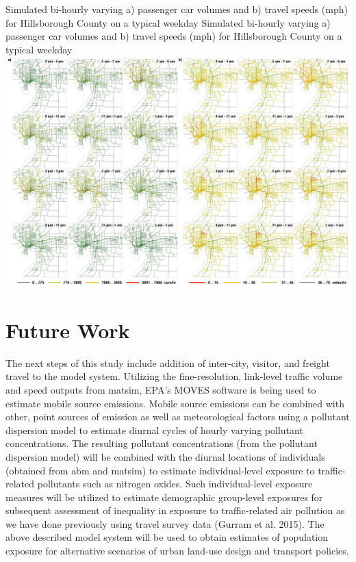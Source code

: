 \createfigure%
{Simulated bi-hourly varying a) passenger car volumes and b) travel speeds (mph) for Hillsborough County on a typical weekday}%
{Simulated bi-hourly varying a) passenger car volumes and b) travel speeds (mph) for Hillsborough County on a typical weekday}%
{\label{fig:tampa-fig3}}%
{\includegraphics[width=1.5\textwidth, angle=90]{./scenarios/figures/tampa-fig3.jpg}}%
{}

\section{Future Work}
The next steps of this study include addition of inter-city, visitor, and freight travel to the model system. 
Utilizing the fine-resolution, link-level traffic volume and speed outputs from \gls{matsim}, EPA’s MOVES software is being used to estimate mobile source emissions. 
Mobile source emissions can be combined with other, point sources of emission as well as meteorological factors using a pollutant dispersion model to estimate diurnal cycles of hourly varying pollutant concentrations. 
The resulting pollutant concentrations (from the pollutant dispersion model) will be combined with the diurnal locations of individuals (obtained from \gls{abm} and \gls{matsim}) to estimate individual-level exposure to traffic-related pollutants such as nitrogen oxides. 
Such individual-level exposure measures will be utilized to estimate demographic group-level exposures for subsequent assessment of inequality in exposure to traffic-related air pollution as we have done previously using travel survey data \citep[][]{}(Gurram et al. 2015). 
The above described model system will be used to obtain estimates of population exposure for alternative scenarios of urban land-use design and transport policies.

